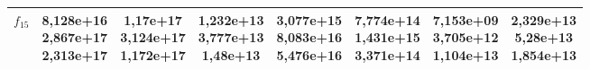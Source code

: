 \begin{table}[t]
\begin{small}
\begin{tabular}{|c|c|c|c|c|c|c|c|}
        $f_{15}$ & \makecell{8,128e+16 \\ 2,867e+17 \\ 2,313e+17} & \makecell{1,17e+17 \\ 3,124e+17 \\ 1,172e+17}  & \makecell{1,232e+13 \\ 3,777e+13 \\ 1,48e+13}  & \makecell{3,077e+15 \\ 8,083e+16 \\ 5,476e+16} & \makecell{7,774e+14 \\ 1,431e+15 \\ 3,371e+14} & \makecell{\textbf{7,153e+09} \\ \textbf{3,705e+12} \\ 1,104e+13} & \makecell{2,329e+13 \\ 5,28e+13 \\ 1,854e+13} \\\hline
    \end{tabular}
\end{small}
\end{table}

